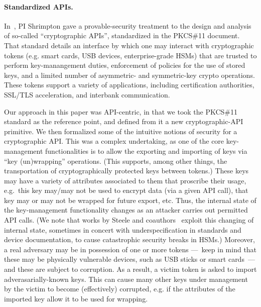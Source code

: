 \paragraph{Standardized APIs. }
%
In~\cite{SSW}, PI Shrimpton gave a provable-security treatment to the design and
analysis of so-called ``cryptographic APIs'', standardized in the PKCS\#11
document\cite{xxx}.  That standard details an interface by which one may
interact with cryptographic tokens (e.g. smart cards, USB devices,
enterprise-grade HSMs) that are trusted to perform key-manangement duties,
enforcement of policies for the use of stored keys, and a limited number of
asymmetric- and symmetric-key crypto operations.  These tokens support a variety
of applications, including certification authorities, SSL/TLS acceleration, and
interbank communication.
%

Our approach in this paper was API-centric, in that we took the PKCS\#11
standard as the reference point, and defined from it a new cryptographic-API
primitive.
%
%
We then formalized some of the intuitive notions of security for a
cryptographic API.  This was a complex undertaking, as one of the core
key-management functionalities is to allow the exporting and importing of keys
via ``key (un)wrapping'' operations.  (This supports, among other things, the
transportation of cryptographically protected keys between tokens.)  These keys
may have a variety of attributes associated to them that proscribe their usage,
e.g.\ this key may/may not be used to encrypt data (via a given API call), that
key may or may not be wrapped for future export, etc.  Thus, the internal state of
the key-management functionality changes as an attacker carries out permitted
API calls. (We note that works by Steele and coauthors~\cite{xxx,yyy,zzz}
exploit this changing of internal state, sometimes in concert with
underspecification in standards and device documentation, to cause catastrophic
security breaks in HSMs.) Moreover, a real adversary may be in possession of one
or more tokens ---~keep in mind that these may be physically vulnerable devices,
such as USB sticks or smart cards~--- and these are subject to corruption.  As a
result, a victim token is asked to import adverasarially-known keys.  This can
cause many other keys under management by the victim to become (effectively)
corrupted, e.g. if the attributes of the imported key allow it to be used for
wrapping.
%


